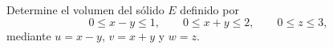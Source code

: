 Determine el volumen del sólido $E$ definido por
\[
0\leq x-y\leq1,\qquad 0\leq x+y\leq2,\qquad 0\leq z\leq3,
\]
mediante $u=x-y$, $v=x+y$ y $w=z$.
